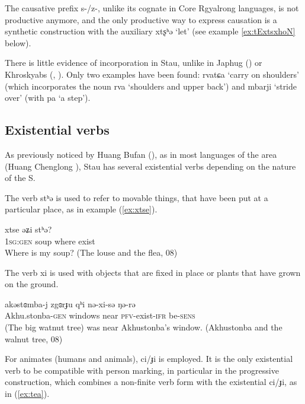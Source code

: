 \documentclass[oneside,a4paper,11pt]{article}
\newcommand{\ipa}[1]{{\phon#1}} %
\begin{document}
The causative prefix \ipa{s-/z-}, unlike its cognate in Core Rgyalrong languages, is not productive anymore, and the only productive way to express causation is a synthetic construction with the auxiliary \ipa{xtʂʰə} `let' (see example \ref{ex:tExtsxhoN} below).
 
 
 There is little evidence of incorporation in Stau, unlike in Japhug (\citealt{jacques12incorp}) or Khroskyabs (\citealt{lai13affixale}, \citealt{lai15person}). Only two examples have been found: \ipa{rvatɕa} `carry on shoulders' (which incorporates the noun \ipa{rva} `shoulders and upper back') and \ipa{mbarji} `stride over' (with \ipa{pa}  `a step').

\subsection{Existential verbs}
As previously noticed by  Huang Bufan (\citeyear[38]{huangbf91daofu}), as in most languages of the area (Huang Chenglong \citeyear{huangcl13cunzai}), Stau has several existential verbs depending on the nature of the S.   

The verb \ipa{stʰə} is used to refer to movable things, that have been put at a particular place, as in example (\ref{ex:xtse}).

\begin{exe}
\ex \label{ex:xtse}
\gll \ipa{ŋi} 	\ipa{xtse} 	\ipa{əʑi} 	\ipa{stʰə?} 	  \\
\textsc{1sg:gen} soup where exist \\
\glt Where is my soup? (The louse and the flea, 08)
\end{exe}
 
The verb \ipa{xi} is used with objects that are fixed in place or plants that have grown on the ground.

\begin{exe}
\ex \label{ex:zgorJu}
\gll
\ipa{akəstɞmba-j} 	\ipa{zgɞrɟu} 	\ipa{qʰi} 	\ipa{nə-xi-sə} 	\ipa{ŋə-rə} \\
Akhu.stonba-\textsc{gen} windows near \textsc{pfv}-exist-\textsc{ifr} be-\textsc{sens} \\
\glt (The big watnut tree) was near Akhustonba's window. (Akhustonba and the walnut tree, 08)
\end{exe}


For animates (humans and animals),  \ipa{ci/ɟi} is employed. It is the only existential verb to be compatible with person marking, in particular in the progressive construction, which combines a non-finite verb form with the existential \ipa{ci/ɟi}, as in (\ref{ex:tea}).
 
\end{document}
